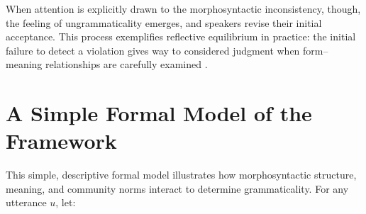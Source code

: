 \documentclass[12pt,letterpaper]{article}
\begin{document}
When attention is explicitly drawn to the morphosyntactic inconsistency, though, the feeling of ungrammaticality emerges, and speakers revise their initial acceptance. This process exemplifies reflective equilibrium in practice: the initial failure to detect a violation gives way to considered judgment when form--meaning relationships are carefully examined \autocite{Pullum2017}.

\newpage
\section{A Simple Formal Model of the Framework}\label{sec:formalism}

This simple, descriptive formal model illustrates how morphosyntactic structure, meaning, and community norms interact to determine grammaticality.  For any utterance \(u\), let:
\end{document}

